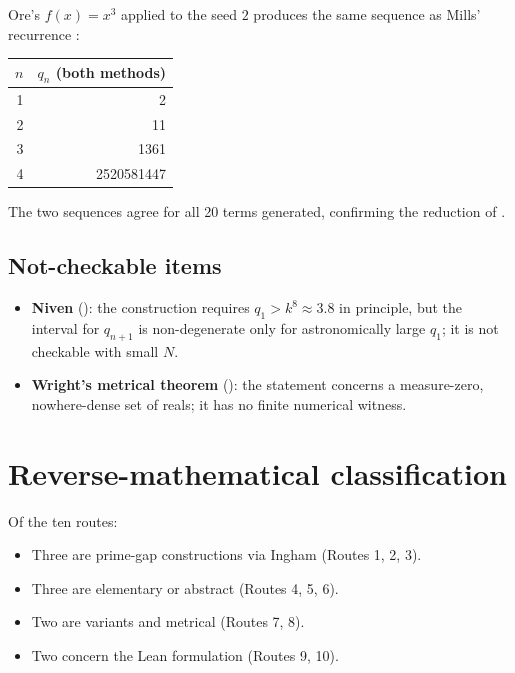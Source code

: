 \documentclass[11pt,reqno]{amsart}
\theoremstyle{redplain}
\numberwithin{equation}{section}
\begin{document}
Ore's $f(x)=x^3$ applied to the seed $2$ produces the same sequence as
Mills' recurrence :

\begin{center}
\begin{tabular}{rr}
\toprule
$n$ & $q_n$ (both methods)\\
\midrule
1 & 2 \\
2 & 11 \\
3 & 1361 \\
4 & 2520581447 \\
\bottomrule
\end{tabular}
\end{center}

The two sequences agree for all 20 terms generated, confirming the
reduction of .

\subsection{Not-checkable items}

\begin{itemize}
\item \textbf{Niven} (): the construction requires
      $q_1>k^8\approx3.8$ in principle, but the interval for $q_{n+1}$ is
      non-degenerate only for astronomically large $q_1$; it is not
      checkable with small $N$.
\item \textbf{Wright's metrical theorem} ():
      the statement concerns a measure-zero, nowhere-dense set of reals;
      it has no finite numerical witness.
\end{itemize}

\section{Reverse-mathematical classification}
\label{sec:summary}

\noindent Of the ten routes:
\begin{itemize}
\item Three are prime-gap constructions via Ingham \cite{Ingham1937}
      (Routes 1, 2, 3).
\item Three are elementary or abstract (Routes 4, 5, 6).
\item Two are variants and metrical (Routes 7, 8).
\item Two concern the Lean formulation (Routes 9, 10).
\end{itemize}
\end{document}
